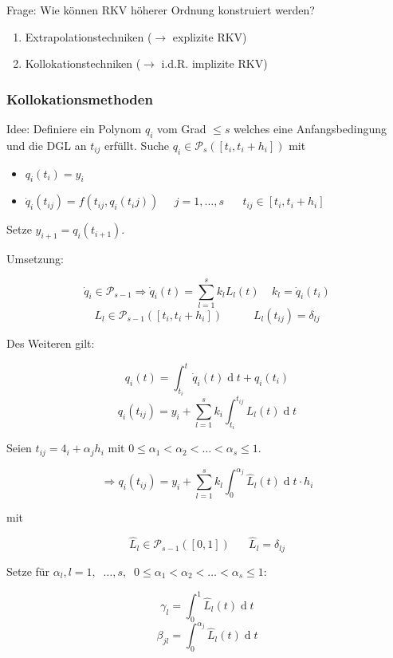 Frage: Wie können RKV höherer Ordnung konstruiert werden?
\begin{enumerate}
	\item Extrapolationstechniken ($\rightarrow$ explizite RKV)
	\item Kollokationstechniken ($\rightarrow$ i.d.R. implizite RKV)
\end{enumerate}

\subsubsection{Kollokationsmethoden}

Idee: Definiere ein Polynom $q_i$ vom Grad $\le s$ welches eine Anfangsbedingung und die DGL an $t_{ij}$ erfüllt. Suche $q_i \in \mathcal{P}_s([t_i, t_i + h_i])$ mit

\begin{itemize}
	\item $q_i(t_i) = y_i$
	\item $\dot{q}_i(t_{ij}) = f(t_{ij}, q_i(t_ij))\;\;\;\;\;j=1,\dots,s\;\;\;\;\;\;t_{ij} \in [t_i, t_i + h_i]$
\end{itemize}

Setze $y_{i+1} = q_i(t_{i+1})$.

Umsetzung: 

$$\dot{q}_i \in \mathcal{P}_{s-1} \Rightarrow \dot{q}_i(t) = \sum_{l=1}^s k_l L_l(t)\;\;\;\;k_l = \dot{q}_i(t_i)$$
$$L_l \in \mathcal{P}_{s-1}\left(\left[t_i, t_i + h_i\right]\right)\;\;\;\;\;\;\;\;\;\;L_l(t_{ij}) = \delta_{lj}$$

Des Weiteren gilt:

$$q_i(t) = \int_{t_i}^t\!\dot{q}_i(t) \operatorname{d}t + q_i(t_i)$$
$$q_i(t_{ij}) = y_i + \sum_{l=1}^s k_i \int_{t_i}^{t_{ij}}\! L_l(t) \operatorname{d}t$$

Seien $t_{ij} = 4_i + \alpha_j h_i$ mit $0 \le \alpha_1 < \alpha_2 < \dots < \alpha_s \le 1$.

$$\Rightarrow q_i(t_{ij}) = y_i + \sum_{l=1}^s k_l \int_{0}^{\alpha_j}\! \hat{L}_l(t) \operatorname{d}t \cdot h_i$$

mit 

$$\hat{L}_l \in \mathcal{P}_{s-1}([0,1])\;\;\;\;\;\;\hat{L}_l = \delta_{lj}$$

Setze für $\alpha_l, l = 1,\;\; \dots, s,\;\; 0 \le \alpha_1 < \alpha_2 < \dots < \alpha_s \le 1$:

$$\gamma_l = \int_0^1\!\hat{L}_l(t)\operatorname{d}t$$
$$\beta_{jl} = \int_0^{\alpha_j}\!\hat{L}_l(t)\operatorname{d}t$$

